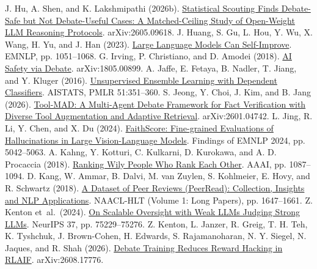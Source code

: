 \begin{thebibliography}{}
 J. Hu, A. Shen, and K. Lakshmipathi (2026b). \href{https://arxiv.org/abs/2605.09618}{Statistical Scouting Finds Debate-Safe but Not Debate-Useful Cases: A Matched-Ceiling Study of Open-Weight LLM Reasoning Protocols}. arXiv:2605.09618.
 J. Huang, S. Gu, L. Hou, Y. Wu, X. Wang, H. Yu, and J. Han (2023). \href{https://doi.org/10.18653/v1/2023.emnlp-main.67}{Large Language Models Can Self-Improve}. EMNLP, pp. 1051--1068.
 G. Irving, P. Christiano, and D. Amodei (2018). \href{https://arxiv.org/abs/1805.00899}{AI Safety via Debate}. arXiv:1805.00899.
 A. Jaffe, E. Fetaya, B. Nadler, T. Jiang, and Y. Kluger (2016). \href{https://proceedings.mlr.press/v51/jaffe16.html}{Unsupervised Ensemble Learning with Dependent Classifiers}. AISTATS, PMLR 51:351--360.
 S. Jeong, Y. Choi, J. Kim, and B. Jang (2026). \href{https://arxiv.org/abs/2601.04742}{Tool-MAD: A Multi-Agent Debate Framework for Fact Verification with Diverse Tool Augmentation and Adaptive Retrieval}. arXiv:2601.04742.
 L. Jing, R. Li, Y. Chen, and X. Du (2024). \href{https://doi.org/10.18653/v1/2024.findings-emnlp.290}{FaithScore: Fine-grained Evaluations of Hallucinations in Large Vision-Language Models}. Findings of EMNLP 2024, pp. 5042--5063.
 A. Kahng, Y. Kotturi, C. Kulkarni, D. Kurokawa, and A. D. Procaccia (2018). \href{https://doi.org/10.1609/aaai.v32i1.11467}{Ranking Wily People Who Rank Each Other}. AAAI, pp. 1087--1094.
 D. Kang, W. Ammar, B. Dalvi, M. van Zuylen, S. Kohlmeier, E. Hovy, and R. Schwartz (2018). \href{https://doi.org/10.18653/v1/N18-1149}{A Dataset of Peer Reviews (PeerRead): Collection, Insights and NLP Applications}. NAACL-HLT (Volume 1: Long Papers), pp. 1647--1661.
 Z. Kenton et~al.\ (2024). \href{https://proceedings.neurips.cc/paper_files/paper/2024/hash/899511e37a8e01e1bd6f6f1d377cc250-Abstract.html}{On Scalable Oversight with Weak LLMs Judging Strong LLMs}. NeurIPS 37, pp. 75229--75276.
 Z. Kenton, L. Janzer, R. Greig, T. H. Teh, K. Tyshchuk, J. Brown-Cohen, H. Edwards, S. Rajamanoharan, N. Y. Siegel, N. Jaques, and R. Shah (2026). \href{https://arxiv.org/abs/2608.17776}{Debate Training Reduces Reward Hacking in RLAIF}. arXiv:2608.17776.

\end{thebibliography}
